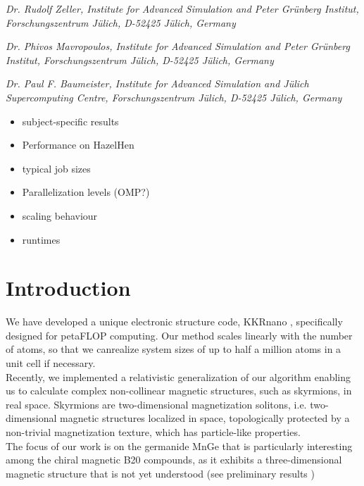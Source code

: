 \documentclass [a4paper, 12pt]{article}
\begin{document}
\phantom{MM} \textit{Dr. Rudolf Zeller,
Institute for Advanced Simulation and Peter Gr\"unberg Institut, Forschungszentrum J\"ulich, D-52425 J\"ulich, Germany
}

\phantom{MM} \textit{Dr. Phivos Mavropoulos,
Institute for Advanced Simulation and Peter Gr\"unberg Institut, Forschungszentrum J\"ulich, D-52425 J\"ulich, Germany
}

\phantom{MM} \textit{Dr. Paul F. Baumeister,
Institute for Advanced Simulation and J\"ulich Supercomputing Centre, Forschungszentrum J\"ulich, D-52425 J\"ulich, Germany
}


\newpage

\vfill
\tableofcontents
\vfill

\newpage

\begin{itemize}
	\item subject-specific results
	\item Performance on HazelHen
	\item typical job sizes
	\item Parallelization levels (OMP?)
	\item scaling behaviour \cite{brommel_juqueen_2017}
	\item runtimes
\end{itemize}

\section{Introduction}
We have developed a unique electronic structure code, 
KKRnano \cite{zeller_towards_2008,thiess_massively_2012},
specifically designed for petaFLOP computing. Our method scales linearly
with the number of atoms, so that we canrealize system sizes of up to 
half a million atoms in a unit cell if necessary.
\\
Recently, we implemented a relativistic generalization of our algorithm 
enabling us to calculate complex non-collinear magnetic structures, such as skyrmions,
in real space. Skyrmions are two-dimensional magnetization solitons, i.e. two-dimensional
magnetic structures localized in space, topologically protected by a non-trivial
magnetization texture, which has particle-like properties. 
\\
The focus of our work is on the germanide MnGe that is particularly
interesting among the chiral magnetic B20 compounds, as it exhibits a three-dimensional magnetic structure
that is not yet understood (see preliminary results
\cite{tanigaki_real-space_2015,rybakov_new_2016,bornemann_investigation_2017})
\end{document}
